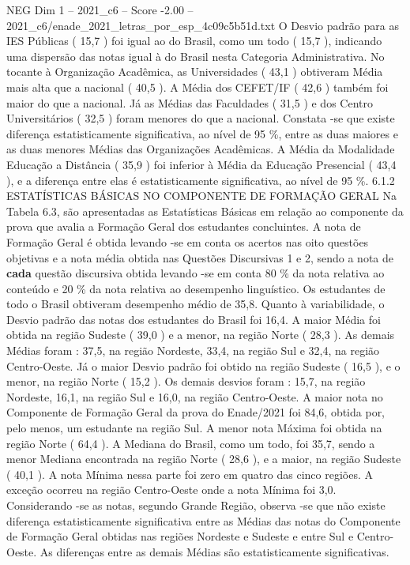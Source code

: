 \begin{textsample}{NEG Dim 1 – 2021\_c6 – Score -2.00 – 2021\_c6/enade\_2021\_letras\_por\_esp\_4c09c5b51d.txt}
O Desvio padrão para as IES Públicas ( 15,7 ) foi igual ao do Brasil, como um todo ( 15,7 ), indicando uma dispersão das notas igual à do Brasil nesta Categoria Administrativa.
No tocante à Organização Acadêmica, as Universidades ( 43,1 ) obtiveram Média mais alta que a nacional ( 40,5 ).
A Média dos CEFET/IF ( 42,6 ) também foi maior do que a nacional.
Já as Médias das Faculdades ( 31,5 ) e dos Centro Universitários ( 32,5 ) foram menores do que a nacional.
Constata -se que existe diferença estatisticamente significativa, ao nível de 95 \%, entre as duas maiores e as duas menores Médias das Organizações Acadêmicas.
A Média da Modalidade Educação a Distância ( 35,9 ) foi inferior à Média da Educação Presencial ( 43,4 ), e a diferença entre elas é estatisticamente significativa, ao nível de 95 \%. 6.1.2 ESTATÍSTICAS BÁSICAS NO COMPONENTE DE FORMAÇÃO GERAL Na Tabela 6.3, são apresentadas as Estatísticas Básicas em relação ao componente da prova que avalia a Formação Geral dos estudantes concluintes.
A nota de Formação Geral é obtida levando -se em conta os acertos nas oito questões objetivas e a nota média obtida nas Questões Discursivas 1 e 2, sendo a nota de \textbf{cada} questão discursiva obtida levando -se em conta 80 \% da nota relativa ao conteúdo e 20 \% da nota relativa ao desempenho linguístico.
Os estudantes de todo o Brasil obtiveram desempenho médio de 35,8.
Quanto à variabilidade, o Desvio padrão das notas dos estudantes do Brasil foi 16,4.
A maior Média foi obtida na região Sudeste ( 39,0 ) e a menor, na região Norte ( 28,3 ).
As demais Médias foram : 37,5, na região Nordeste, 33,4, na região Sul e 32,4, na região Centro-Oeste.
Já o maior Desvio padrão foi obtido na região Sudeste ( 16,5 ), e o menor, na região Norte ( 15,2 ).
Os demais desvios foram : 15,7, na região Nordeste, 16,1, na região Sul e 16,0, na região Centro-Oeste.
A maior nota no Componente de Formação Geral da prova do Enade/2021 foi 84,6, obtida por, pelo menos, um estudante na região Sul.
A menor nota Máxima foi obtida na região Norte ( 64,4 ).
A Mediana do Brasil, como um todo, foi 35,7, sendo a menor Mediana encontrada na região Norte ( 28,6 ), e a maior, na região Sudeste ( 40,1 ).
A nota Mínima nessa parte foi zero em quatro das cinco regiões.
A exceção ocorreu na região Centro-Oeste onde a nota Mínima foi 3,0.
Considerando -se as notas, segundo Grande Região, observa -se que não existe diferença estatisticamente significativa entre as Médias das notas do Componente de Formação Geral obtidas nas regiões Nordeste e Sudeste e entre Sul e Centro-Oeste.
As diferenças entre as demais Médias são estatisticamente significativas.

\end{textsample}
